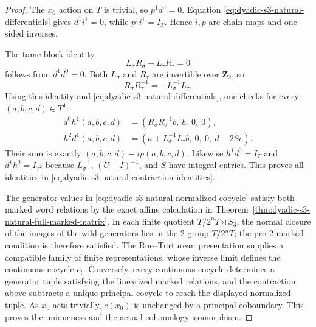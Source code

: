 \begin{proof}
The $x_0$ action on $T$ is
trivial, so $p^1d^0=0$.
Equation
\eqref{eq:dyadic-s3-natural-differentials}
gives $d^1i^1=0$, while
$p^1i^1=I_T$.
Hence $i,p$ are chain maps
and one-sided inverses.

The tame block identity
\[
L_\sigma R_\sigma+
L_\tau R_\tau=0
\]
follows from $d^1d^0=0$.
Both $L_\sigma$ and $R_\tau$
are invertible over $\mathbf Z_2$,
so
\[
R_\sigma R_\tau^{-1}
=-L_\sigma^{-1}L_\tau.
\]
Using this identity and
\eqref{eq:dyadic-s3-natural-differentials},
one checks for every
$(a,b,c,d)\in T^4$:
\[
\begin{aligned}
d^0h^1(a,b,c,d)&=
(R_\sigma R_\tau^{-1}b,\ b,\ 0,\ 0),\\
h^2d^1(a,b,c,d)&=
(a+L_\sigma^{-1}L_\tau b,\
 0,\ 0,\ d-2Sc).
\end{aligned}
\]
Their sum is exactly
$(a,b,c,d)-i p(a,b,c,d)$.
Likewise $h^1d^0=I_T$ and
$d^1h^2=I_{T^2}$ because
$L_\sigma^{-1}$, $(U-I)^{-1}$,
and $S$ have integral entries.
This proves all identities in
\eqref{eq:dyadic-s3-natural-contraction-identities}.

The generator values in
\eqref{eq:dyadic-s3-natural-normalized-cocycle}
satisfy both marked word
relations by the exact affine
calculation in
Theorem~\ref{thm:dyadic-s3-natural-full-marked-matrix}.
In each finite quotient
$T/2^nT\rtimes S_3$, the normal
closure of the images of the
wild generators lies in the
$2$-group $T/2^nT$;
the pro-$2$ marked condition is
therefore satisfied.  The
Roe--Turturean presentation
\cite{RoeTurtureanGQ2} supplies
a compatible family of
finite representations, whose
inverse limit defines the
continuous cocycle $c_t$.
Conversely, every continuous
cocycle determines a generator
tuple satisfying the linearized
marked relations, and the
contraction above subtracts
a unique principal cocycle
to reach the displayed
normalized tuple.
As $x_0$ acts trivially,
$c(x_0)$ is unchanged by a
principal coboundary.
This proves the uniqueness
and the actual cohomology
isomorphism.
\end{proof}

